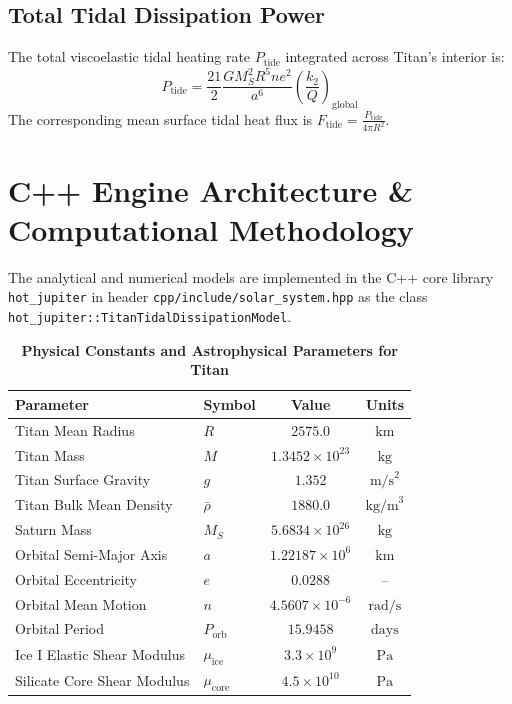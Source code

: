 \documentclass[11pt,a4paper]{article}
\begin{document}
\subsection{Total Tidal Dissipation Power}
The total viscoelastic tidal heating rate $P_{\text{tide}}$ integrated across Titan's interior is:
\begin{equation}
P_{\text{tide}} = \frac{21}{2} \frac{G M_S^2 R^5 n e^2}{a^6} \left(\frac{k_2}{Q}\right)_{\text{global}}
\end{equation}
The corresponding mean surface tidal heat flux is $F_{\text{tide}} = \frac{P_{\text{tide}}}{4 \pi R^2}$.

\section{C++ Engine Architecture \& Computational Methodology}
The analytical and numerical models are implemented in the C++ core library \texttt{hot\_jupiter} in header \texttt{cpp/include/solar\_system.hpp} as the class \texttt{hot\_jupiter::TitanTidalDissipationModel}.

\begin{table}[H]
\centering
\caption{\textbf{Physical Constants and Astrophysical Parameters for Titan}}
\label{tab:params}
\begin{tabular}{llcc}
\toprule
\textbf{Parameter} & \textbf{Symbol} & \textbf{Value} & \textbf{Units} \\
\midrule
Titan Mean Radius & $R$ & $2575.0$ & $\text{km}$ \\
Titan Mass & $M$ & $1.3452 \times 10^{23}$ & $\text{kg}$ \\
Titan Surface Gravity & $g$ & $1.352$ & $\text{m/s}^2$ \\
Titan Bulk Mean Density & $\bar{\rho}$ & $1880.0$ & $\text{kg/m}^3$ \\
Saturn Mass & $M_S$ & $5.6834 \times 10^{26}$ & $\text{kg}$ \\
Orbital Semi-Major Axis & $a$ & $1.22187 \times 10^6$ & $\text{km}$ \\
Orbital Eccentricity & $e$ & $0.0288$ & -- \\
Orbital Mean Motion & $n$ & $4.5607 \times 10^{-6}$ & $\text{rad/s}$ \\
Orbital Period & $P_{\text{orb}}$ & $15.9458$ & $\text{days}$ \\
Ice I Elastic Shear Modulus & $\mu_{\text{ice}}$ & $3.3 \times 10^9$ & $\text{Pa}$ \\
Silicate Core Shear Modulus & $\mu_{\text{core}}$ & $4.5 \times 10^{10}$ & $\text{Pa}$ \\
\bottomrule
\end{tabular}
\end{table}
\end{document}
